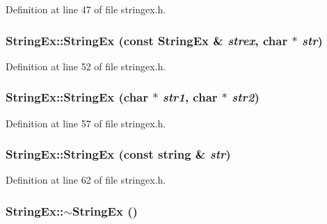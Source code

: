Definition at line 47 of file stringex.h.\hypertarget{classStringEx_5304827ec0bfe2e225031653a82256c2}{
\subsubsection[{StringEx}]{\setlength{\rightskip}{0pt plus 5cm}StringEx::StringEx (const {\bf StringEx} \& {\em strex}, \/  char $\ast$ {\em str})}}
\label{classStringEx_5304827ec0bfe2e225031653a82256c2}




Definition at line 52 of file stringex.h.\hypertarget{classStringEx_c34d876aa1b6fa515deadeea548b6806}{
\subsubsection[{StringEx}]{\setlength{\rightskip}{0pt plus 5cm}StringEx::StringEx (char $\ast$ {\em str1}, \/  char $\ast$ {\em str2})}}
\label{classStringEx_c34d876aa1b6fa515deadeea548b6806}




Definition at line 57 of file stringex.h.\hypertarget{classStringEx_c9a8ce33aa75cfb5fd0db69a66a074a4}{
\subsubsection[{StringEx}]{\setlength{\rightskip}{0pt plus 5cm}StringEx::StringEx (const string \& {\em str})}}
\label{classStringEx_c9a8ce33aa75cfb5fd0db69a66a074a4}




Definition at line 62 of file stringex.h.\hypertarget{classStringEx_c8ae8071f10ebdec5dcd0991990bad55}{
\subsubsection[{$\sim$StringEx}]{\setlength{\rightskip}{0pt plus 5cm}StringEx::$\sim$StringEx ()}}
\label{classStringEx_c8ae8071f10ebdec5dcd0991990bad55}




